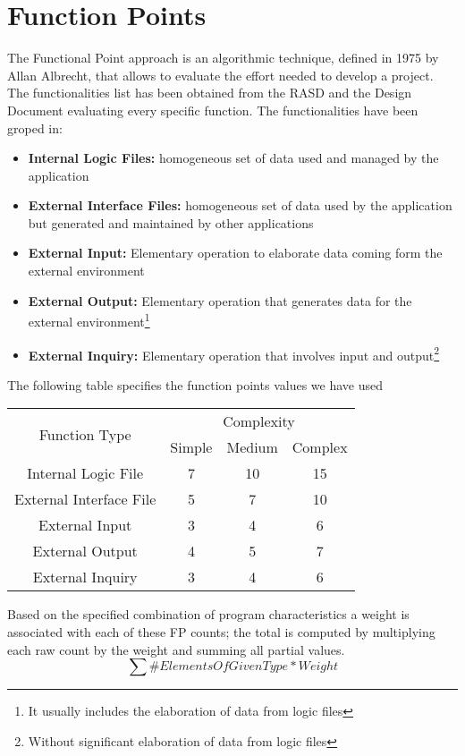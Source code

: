 \section{Function Points}
The Functional Point approach is an algorithmic technique, defined in 1975 by Allan Albrecht, that allows to evaluate the effort needed to develop a project. The functionalities list has been obtained from the RASD and the Design Document evaluating every specific function.
The functionalities have been groped in:
\begin{itemize}
	\item \textbf{Internal Logic Files:} homogeneous set of data used and managed by the application
	\item \textbf{External Interface Files:} homogeneous set of data used by the application but generated and maintained by other applications
	\item \textbf{External Input:} Elementary operation to elaborate data coming form the external environment
	\item \textbf{External Output:} Elementary operation that generates data for the external environment\footnote{It usually includes the elaboration of data from logic files}
	\item \textbf{External Inquiry:} Elementary operation that involves input and output\footnote{Without significant elaboration of data from logic files}
\end{itemize}
The following table specifies the function points values we have used

\begin{tabular}{|c|c|c|c|}\hline
	\multirow{2}{*}{Function Type} & \multicolumn{3}{c|}{Complexity} \\ \cline{2-4}
	 & Simple & Medium & Complex \\ \hline
	Internal Logic File	& 7 & 10 & 15 \\ \hline
	External Interface File	& 5 & 7 & 10 \\ \hline
	External Input	& 3 & 4 & 6 \\ \hline
	External Output	& 4 & 5 & 7 \\ \hline
	External Inquiry& 3 & 4 & 6 \\ \hline
\end{tabular} 

Based on the specified combination of program characteristics a weight is associated with each of these FP counts; the total is computed by multiplying each raw count by the weight and summing all partial values.
$$\sum \#ElementsOfGivenType * Weight$$
